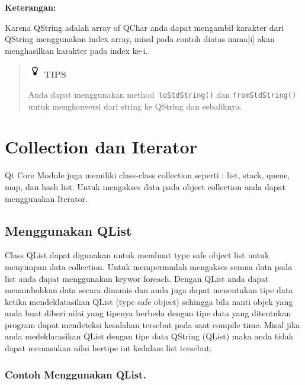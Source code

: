 \textbf{Keterangan:}

  Karena QString adalah array of QChar anda dapat mengambil karakter
  dari QString menggunakan index array, misal pada contoh diatas
  nama{[}i{]} akan menghasilkan karakter pada index ke-i.

\begin{quotation}
\includegraphics{../manuscript/images/tips.png} 	\textbf{TIPS} 
	
	Anda dapat
	menggunakan method\texttt{ toStdString()} dan \texttt{fromStdString()} untuk mengkonversi
	dari string ke QString dan sebaliknya.
\end{quotation}
 

\section{Collection dan Iterator}\label{collection-dan-iterator}

Qt Core Module juga memiliki class-class collection seperti : list,
stack, queue, map, dan hash list. Untuk mengakses data pada object
collection anda dapat menggunakan Iterator.

\subsection{Menggunakan QList}\label{menggunakan-qlist}

Class QList dapat digunakan untuk membuat type safe object list untuk
menyimpan data collection. Untuk mempermudah mengakses semua data pada
list anda dapat menggunakan keywor foreach. Dengan QList anda dapat
menambahkan data secara dinamis dan anda juga dapat menentukan tipe data
ketika mendeklatasikan QList (type safe object) sehingga bila nanti
objek yang anda buat diberi nilai yang tipenya berbeda dengan tipe data
yang ditentukan program dapat mendeteksi kesalahan tersebut pada saat
compile time. Misal jika anda medeklarasikan QList dengan tipe data
QString (QList) maka anda tidak dapat memasukan nilai bertipe int
kedalam list tersebut.

\subsubsection*{Contoh Menggunakan QList.}

